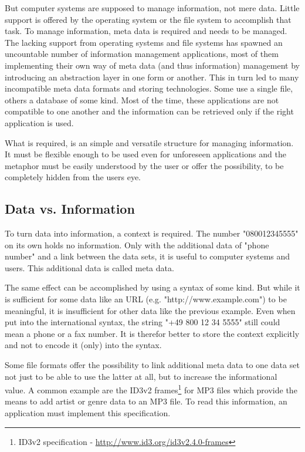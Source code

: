 \documentclass[12pt,a4paper,notitlepage,twocolumn,oneside]{article}
\begin{document}
But computer systems are supposed to manage information, not mere data. Little support is offered by the operating system or the file system to accomplish that task. To manage information, meta data is required and needs to be managed. The lacking support from operating systems and file systems has spawned an uncountable number of information management applications, most of them implementing their own way of meta data (and thus information) management by introducing an abstraction layer in one form or another. This in turn led to many incompatible meta data formats and storing technologies. Some use a single file, others a database of some kind. Most of the time, these applications are not compatible to one another and the information can be retrieved only if the right application is used.

What is required, is an simple and versatile structure for managing information. It must be flexible enough to be used even for unforeseen applications and the metaphor must be easily understood by the user or offer the possibility, to be completely hidden from the users eye.

\subsection{Data vs. Information}
To turn data into information, a context is required. The number "080012345555" on its own holds no information. Only with the additional data of "phone number" and a link between the data sets, it is useful to computer systems and users. This additional data is called meta data.

The same effect can be accomplished by using a syntax of some kind. But while it is sufficient for some data like an URL (e.g. "http://www.example.com") to be meaningful, it is insufficient for other data like the previous example. Even when put into the international syntax, the string "+49 800 12 34 5555" still could mean a phone or a fax number. It is therefor better to store the context explicitly and not to encode it (only) into the syntax. 

Some file formats offer the possibility to link additional meta data to one data set not just to be able to use the latter at all, but to increase the informational value. A common example are the ID3v2 frames\footnote{ID3v2 specification - \url{http://www.id3.org/id3v2.4.0-frames}} for MP3 files which provide the means to add artist or genre data to an MP3 file. To read this information, an application must implement this specification.
\end{document}
